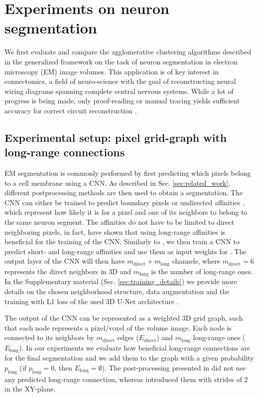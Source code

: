 \section{Experiments on neuron segmentation}\label{sec:neuro_segm_exp}

We first evaluate and compare the agglomerative clustering algorithms described in the generalized framework on the task of neuron segmentation in electron microscopy (EM) image volumes. This application is of key interest in connectomics, a field of neuro-science with the goal of reconstructing neural wiring diagrams spanning complete central nervous systems. While a lot of progress is being made, only proof-reading or manual tracing yields sufficient accuracy for correct circuit reconstruction \cite{schlegel2017learning}.

\subsection{Experimental setup: pixel grid-graph with long-range connections} \label{sec:grid_graph}
EM segmentation is commonly performed by first predicting which pixels belong to a cell membrane using a CNN. As described in Sec. \ref{sec:related_work}, different postprocessing methods are then used to obtain a segmentation. The CNN can either be trained to predict boundary pixels \cite{beier2017multicut,ciresan2012deep} or undirected affinities \cite{wolf2018mutex,lee2017superhuman,funke2018large}, which represent how likely it is for a pixel and one of its neighbors to belong to the same neuron segment. The affinities do not have to be limited to direct neighboring pixels, in fact, \cite{lee2017superhuman} have shown that using long-range affinities is beneficial for the training of the CNN. Similarly to \cite{wolf2018mutex}, we then train a CNN to predict short- and long-range affinities and use them as input weights for \algname{}. The output layer of the CNN will then have $m_{\mathrm{direct}}+m_{\mathrm{long}}$ channels, where $m_{\mathrm{direct}}=6$ represents the direct neighbors in 3D and $m_{\mathrm{long}}$ is the number of long-range ones. In the Supplementary material (Sec. \ref{sec:training_details}) we provide more details on the chosen neighborhood structure, data augmentation and the training with L1 loss of the used 3D U-Net architecture \cite{ronneberger2015u,cciccek20163d}.

The output of the CNN can be represented as a weighted 3D grid graph, such that each node represents a pixel/voxel of the volume image. Each node is connected to its neighbors by $m_{\mathrm{direct}}$ edges ($E_{\mathrm{direct}}$) and $m_{\mathrm{long}}$ long-range ones ($E_{\mathrm{long}}$).
In our experiments we evaluate how beneficial long-range connections are for the final segmentation and we add them to the graph with a given probability $p_{\mathrm{long}}$ (if $p_{\mathrm{long}}=0$, then $E_{\mathrm{long}}=\emptyset$).
The post-processing presented in \cite{lee2017superhuman} did not use any predicted long-range connection, whereas \cite{wolf2018mutex} introduced them with strides of 2 in the XY-plane.

